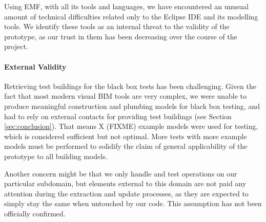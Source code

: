 Using EMF, with all its tools and languages, we have encountered an unusual amount of technical difficulties related only to the Eclipse IDE and its modelling tools. We identify these tools as an internal threat to the validity of the prototype, as our trust in them has been decreasing over the course of the project.

\paragraph{External Validity} Retrieving test buildings for the black box tests has been challenging. Given the fact that most modern visual BIM tools are very complex, we were unable to produce meaningful construction and plumbing models for black box testing, and had to rely on external contacts for providing test buildings (see Section \ref{sec:conclusion}). That means X (FIXME) example models were used for testing, which is considered sufficient but not optimal. More tests with more example models must be performed to solidify the claim of general applicability of the prototype to all building models.

Another concern might be that we only handle and test operations on our particular subdomain, but elements external to this domain are not paid any attention during the extraction and update processes, as they are expected to simply stay the same when untouched by our code. This assumption has not been officially confirmed.







